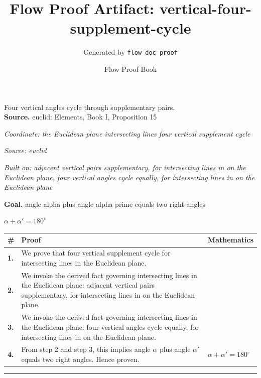 \documentclass[11pt]{article}
\title{Flow Proof Artifact: vertical-four-supplement-cycle}
\author{Generated by \texttt{flow doc proof}}
\date{Flow Proof Book}
\theoremstyle{definition}
\begin{document}
\maketitle
Four vertical angles cycle through supplementary pairs.\\[0.5em]
\textbf{Source.} euclid: Elements, Book I, Proposition 15\\[0.5em]
\bigskip
{}\par
\smallskip\noindent\textit{Coordinate: the Euclidean plane \cdot intersecting lines \cdot four vertical supplement cycle}\par
\smallskip\noindent\textit{Source: euclid}\par
\smallskip\noindent\textit{Built on: adjacent vertical pairs supplementary, for intersecting lines in on the Euclidean plane, four vertical angles cycle equally, for intersecting lines in on the Euclidean plane}\par
\medskip
\noindent\textbf{Goal.} angle alpha plus angle alpha prime equals two right angles\par
\noindent$\displaystyle \alpha + \alpha' = 180^\circ$\par
\medskip
\noindent
\begin{tabular}{@{} >{\raggedright\arraybackslash}p{} >{\raggedright\arraybackslash}p{} >{\raggedleft\arraybackslash}p{} @{}}
\textbf{\#} & \textbf{Proof} & \textbf{Mathematics} \\
\midrule
\textbf{1.} & We prove that four vertical supplement cycle for intersecting lines in the Euclidean plane. & \\[0.45em]
\textbf{2.} & We invoke the derived fact governing intersecting lines in the Euclidean plane: adjacent vertical pairs supplementary, for intersecting lines in on the Euclidean plane. & \\[0.45em]
\textbf{3.} & We invoke the derived fact governing intersecting lines in the Euclidean plane: four vertical angles cycle equally, for intersecting lines in on the Euclidean plane. & \\[0.45em]
\textbf{4.} & From step 2 and step 3, this implies angle $\alpha$ plus angle $\alpha$$'$ equals two right angles. Hence proven. & $\displaystyle \alpha + \alpha' = 180^\circ$ \\[0.45em]
\bottomrule
\end{tabular}
\label{thm:Geometry-intersecting lines-four_vertical_supplement_cycle}
\par\medskip\hrule
\end{document}
